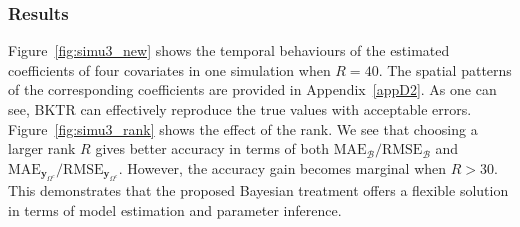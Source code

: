 \documentclass[12pt]{article}
\newcommand{\bd}[1]{\boldsymbol{#1}}
\begin{document}
\subsubsection{Results}





Figure~\ref{fig:simu3_new} shows the temporal behaviours of the estimated coefficients of four covariates in one simulation when $R=40$. %
The spatial patterns of the corresponding coefficients are provided in  Appendix~\ref{appD2}. As one can see, BKTR can effectively reproduce the true values with acceptable errors. Figure~\ref{fig:simu3_rank} shows the effect of the rank. We see that choosing a larger rank $R$ gives better accuracy in terms of both $\text{MAE}_{\boldsymbol{\mathcal{B}}}/\text{RMSE}_{\boldsymbol{\mathcal{B}}}$ and $\text{MAE}_{\boldsymbol{y}_{\Omega^c}}/\text{RMSE}_{\bd{{y}}_{\Omega^c}}$. However, the accuracy gain becomes marginal when $R>30$. This demonstrates that the proposed Bayesian treatment offers a flexible solution in terms of model estimation and parameter inference.


\end{document}
